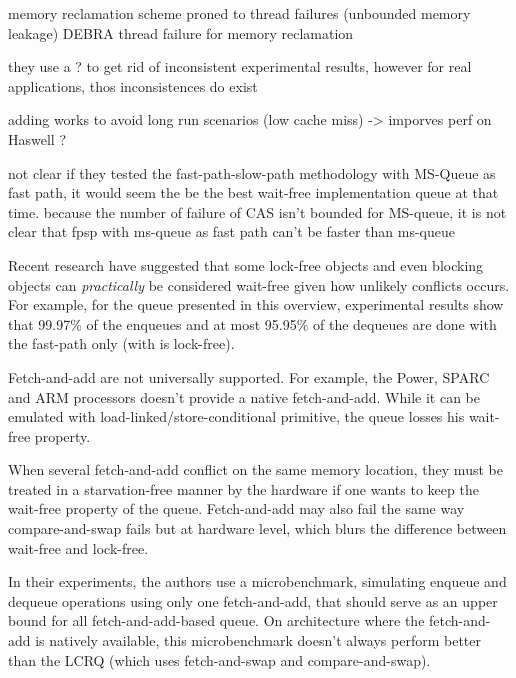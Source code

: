 memory reclamation scheme proned to thread failures (unbounded memory leakage)
DEBRA thread failure for memory reclamation

they use a ? to get rid of inconsistent experimental results, however for real
applications, thos inconsistences do exist

adding works to avoid long run scenarios (low cache miss) -> imporves perf on
Haswell ?

not clear if they tested the fast-path-slow-path methodology with
MS-Queue as fast path, it would seem the be the best wait-free implementation
queue at that time. because the number of failure of CAS isn't bounded for
MS-queue, it is not clear that fpsp with ms-queue as fast path can't be faster
than ms-queue

Recent research have suggested that some lock-free objects and even blocking
objects can \textit{practically} be considered wait-free
\cite{David:2016:CSD:2935764.2935774} \cite{Alistarh:2016:LCA:2997039.2903136}
given how unlikely conflicts occurs. For example, for the queue presented in
this overview, experimental results show that 99.97\% of the enqueues and at
most 95.95\% of the dequeues are done with the fast-path only (with is
lock-free).

Fetch-and-add are not universally supported. For example, the Power, SPARC and
ARM processors doesn't provide a native fetch-and-add. While it can be emulated
with load-linked/store-conditional primitive, the queue losses his wait-free
property.

When several fetch-and-add conflict on the same memory location, they must be
treated in a starvation-free manner by the hardware if one wants to keep the
wait-free property of the queue. Fetch-and-add may also fail the same way
compare-and-swap fails but at hardware level, which blurs the difference between
wait-free and lock-free.

In their experiments, the authors use a microbenchmark, simulating enqueue and
dequeue operations using only one fetch-and-add, that should serve as an upper
bound for all fetch-and-add-based queue. On architecture where the fetch-and-add
is natively available, this microbenchmark doesn't always perform better than
the LCRQ (which uses fetch-and-swap and compare-and-swap).
